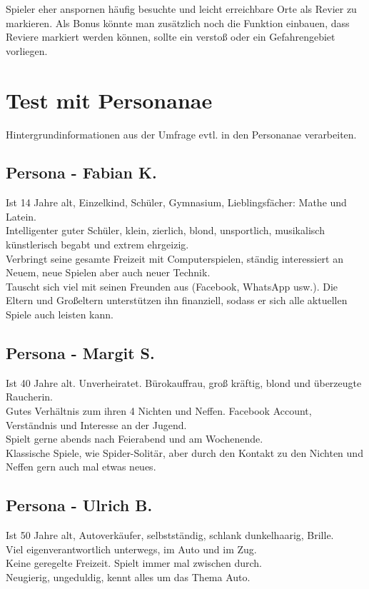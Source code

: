 Spieler eher anspornen häufig besuchte und leicht erreichbare Orte als Revier zu markieren. Als Bonus könnte man zusätzlich noch die Funktion einbauen, dass Reviere markiert werden können, sollte ein verstoß oder ein Gefahrengebiet vorliegen. 
%



\section{Test mit Personanae}
Hintergrundinformationen aus der Umfrage evtl. in den Personanae verarbeiten.


\subsection{Persona - Fabian K.} 
Ist 14 Jahre alt, Einzelkind, Schüler, Gymnasium, Lieblingsfächer: Mathe und Latein. \\ 
Intelligenter guter Schüler, klein, zierlich, blond, unsportlich, musikalisch künstlerisch begabt und extrem ehrgeizig.   \\
Verbringt seine gesamte Freizeit mit Computerspielen, ständig interessiert an Neuem, neue Spielen aber auch neuer Technik. \\
Tauscht sich viel mit seinen Freunden aus (Facebook, WhatsApp usw.).
Die Eltern und Großeltern unterstützen ihn finanziell, sodass er sich alle aktuellen Spiele auch leisten kann.

\subsection{Persona - Margit S.} 
Ist 40 Jahre alt. Unverheiratet. Bürokauffrau, groß kräftig, blond und überzeugte Raucherin.  \\
Gutes Verhältnis zum ihren 4 Nichten und Neffen. Facebook Account, Verständnis und Interesse an der Jugend. \\
Spielt gerne abends nach Feierabend und am Wochenende.\\
Klassische Spiele, wie Spider-Solitär, aber durch den Kontakt zu den Nichten und Neffen gern auch mal etwas neues.

\subsection{Persona - Ulrich B.} 
Ist 50 Jahre alt, Autoverkäufer, selbstständig, schlank dunkelhaarig, Brille. \\
Viel eigenverantwortlich unterwegs, im Auto und im Zug.\\
Keine geregelte Freizeit. Spielt immer mal zwischen durch. \\
Neugierig, ungeduldig, kennt alles um das Thema Auto.

